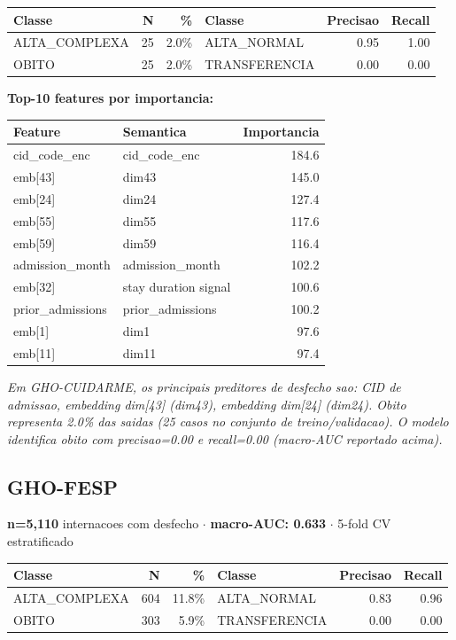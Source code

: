 \documentclass[11pt,a4paper]{article}
\begin{document}
\begin{tabular}{lrr|lrr}
\toprule
Classe & N & \% & Classe & Precisao & Recall \\
\midrule
ALTA\_COMPLEXA & 25 & 2.0\% & ALTA\_NORMAL & 0.95 & 1.00 \\
OBITO & 25 & 2.0\% & TRANSFERENCIA & 0.00 & 0.00 \\
\bottomrule
\end{tabular}

\vspace{4pt}\noindent\textbf{Top-10 features por importancia:}

\begin{tabular}{llr}
\toprule
Feature & Semantica & Importancia \\
\midrule
cid\_code\_enc & cid\_code\_enc & 184.6 \\
emb[43] & dim43 & 145.0 \\
emb[24] & dim24 & 127.4 \\
emb[55] & dim55 & 117.6 \\
emb[59] & dim59 & 116.4 \\
admission\_month & admission\_month & 102.2 \\
emb[32] & stay duration signal & 100.6 \\
prior\_admissions & prior\_admissions & 100.2 \\
emb[1] & dim1 & 97.6 \\
emb[11] & dim11 & 97.4 \\
\bottomrule
\end{tabular}

\vspace{4pt}\noindent\textit{Em GHO-CUIDARME, os principais preditores de desfecho sao: CID de admissao, embedding dim[43] (dim43), embedding dim[24] (dim24). Obito representa 2.0\% das saidas (25 casos no conjunto de treino/validacao). O modelo identifica obito com precisao=0.00 e recall=0.00 (macro-AUC reportado acima).}

\subsection{GHO-FESP}
\textbf{n=5,110} internacoes com desfecho $\cdot$ \textbf{macro-AUC: 0.633} $\cdot$ 5-fold CV estratificado

\begin{tabular}{lrr|lrr}
\toprule
Classe & N & \% & Classe & Precisao & Recall \\
\midrule
ALTA\_COMPLEXA & 604 & 11.8\% & ALTA\_NORMAL & 0.83 & 0.96 \\
OBITO & 303 & 5.9\% & TRANSFERENCIA & 0.00 & 0.00 \\
\bottomrule
\end{tabular}
\end{document}
